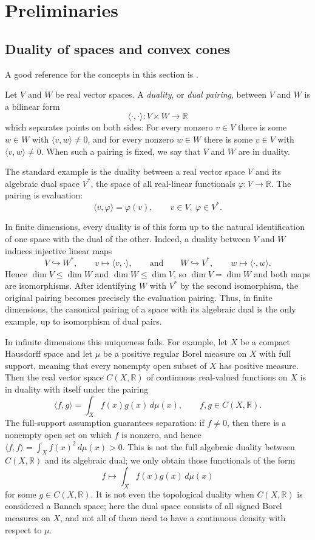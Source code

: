 \documentclass[11pt,onecolumn]{article}
\theoremstyle{plain}
\theoremstyle{definition}
\begin{document}
\section{Preliminaries}

\subsection{Duality of spaces and convex cones}
\label{sec:space}

A good reference for the concepts in this section is \cite{Barvinok2002}.

Let $V$ and $W$ be real vector spaces.  A \emph{duality}, or \emph{dual pairing},
between $V$ and $W$ is a bilinear form
\[
    \langle \cdot,\cdot\rangle \colon V\times W\to \mathbb{R}
\]
which separates points on both sides: For every nonzero $v\in V$ there is
some $w\in W$ with $\langle v,w\rangle\neq 0$, and for every nonzero
$w\in W$ there is some $v\in V$ with $\langle v,w\rangle\neq 0$. 
When such a pairing is fixed, we say that $V$ and $W$ are in duality.  

The standard example is the duality between a real vector space $V$ and its
algebraic dual space $V^*$, the space of all real-linear functionals
$\varphi\colon V\to\mathbb{R}$.  The pairing is evaluation:
\[
    \langle v,\varphi\rangle=\varphi(v),
    \qquad v\in V,\ \varphi\in V^*.
\]

In finite dimensions, every duality is of this form up to the natural
identification of one space with the dual of the other.  Indeed, a duality
between  $V$ and $W$ induces injective linear maps
\[
    V\hookrightarrow W^*,\qquad v\mapsto \langle v,\cdot\rangle,
    \qquad\text{and}\qquad
    W\hookrightarrow V^*,\qquad w\mapsto \langle \cdot,w\rangle .
\]
Hence $\dim V\leqslant \dim W$ and $\dim W\leqslant \dim V$, so $\dim V=\dim W$ and
both maps are isomorphisms.  After identifying $W$ with $V^*$ by the second
isomorphism, the original pairing becomes precisely the evaluation pairing.
Thus, in finite dimensions, the canonical pairing of a space with its
algebraic dual is the only example, up to isomorphism of dual pairs.

In infinite dimensions this uniqueness fails.  
For example, let
$X$ be a compact Hausdorff space and let $\mu$ be a positive regular Borel
measure on $X$ with full support, meaning that every nonempty open subset of
$X$ has positive measure.  Then the real vector space $C(X,\mathbb R)$ of continuous
real-valued functions on $X$ is in duality with itself under the pairing
\[
    \langle f,g\rangle=\int_X f(x)g(x)\,d\mu(x),
    \qquad f,g\in C(X,\mathbb R).
\]
The full-support assumption guarantees separation: if $f\neq 0$, then there
is a nonempty open set on which $f$ is nonzero, and hence
$\langle f,f\rangle=\int_X f(x)^2\,d\mu(x)>0$. This is not
the full algebraic duality between $C(X,\mathbb R)$ and its algebraic dual; we only obtain those functionals of the
form
\[
    f\longmapsto \int_X f(x)g(x)\,d\mu(x)
\]
for some $g\in C(X,\mathbb R)$. It is not even the topological duality when $C(X,\mathbb R)$ is considered a Banach space; here the dual space consists of all signed Borel measures on $X$, and not all of them need to have a continuous density with respect to $\mu.$
\end{document}
